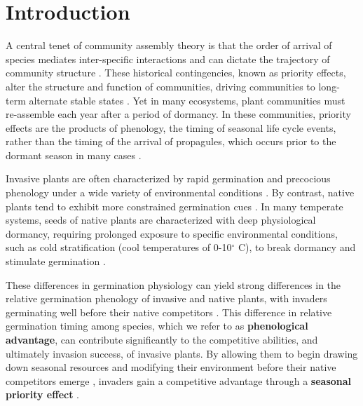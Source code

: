 \documentclass{article}[11pt]
\begin{document}
\section*{Introduction}
 A central tenet of community assembly theory is that the order of arrival of species mediates inter-specific interactions and can dictate the trajectory of community structure \citep{Fukami2015}. These historical contingencies, known as priority effects, alter the structure and function of communities, driving communities to long-term alternate stable states \citep{Fukami2011}. Yet in many ecosystems, plant communities must re-assemble each year after a period of dormancy. In these communities, priority effects are the products of phenology, the timing of seasonal life cycle events, %
rather than the timing of the arrival of propagules, which occurs prior to the dormant season in many cases \citep{Rudolf:2019aa,Howe:1982aa,Baskin:1988aa}. 

Invasive plants are often characterized by rapid germination and precocious phenology under a wide variety of environmental conditions \citep{Gioria2018,Gioria:2017wo,Wolkovich:2011uh,Smith:2013uj}. By contrast, native plants tend to exhibit more constrained germination cues \citep{Marushia:2010ug,Wainwright:2013tv,Van-Clef:2001to}. In many temperate systems, seeds of native plants are characterized with deep physiological dormancy, requiring prolonged exposure to specific environmental conditions, such as cold stratification (cool temperatures of 0-10$^{\circ}$ C), to break dormancy and stimulate germination \citep{Brink:2013wr,Cavieres:2017aa,Bradford:2007tj}. 

These differences in germination physiology can yield strong differences in the relative germination phenology of invasive and native plants, with invaders germinating well before their native competitors \citep{Gioria:2017wo}. This difference in relative germination timing among species, which we refer to as \textbf{phenological advantage}, can contribute significantly to the competitive abilities, and ultimately invasion success, of invasive plants. By allowing them to begin drawing down seasonal resources and modifying their environment before their native competitors emerge \citep{Kardol2013}, invaders gain a competitive advantage through a \textbf{seasonal priority effect} \citep{Wainwright_2011}.
\end{document}
